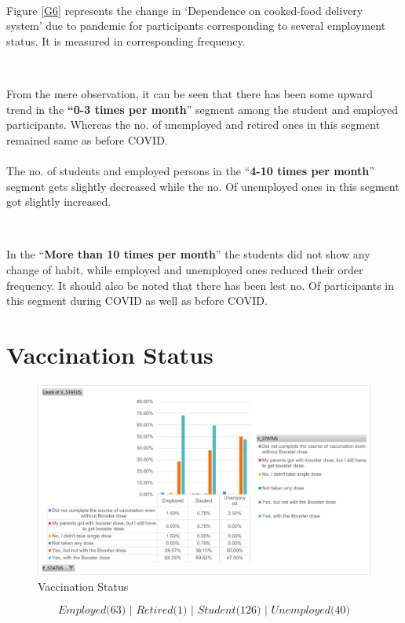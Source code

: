 \ 

Figure \ref{G6} represents the change in ‘Dependence on cooked-food delivery system’ due to pandemic for participants corresponding to several employment status. It is measured in corresponding frequency. 

\ 

From the mere observation, it can be seen that there has been some upward trend in the \textbf{“0-3 times per month}” segment among the student and employed participants. Whereas the no. of unemployed and retired ones in this segment remained same as before COVID.\\ \\
The no. of students and employed persons in the “\textbf{4-10 times per month}” segment gets slightly decreased while the no. Of unemployed ones in this segment got slightly increased.

\

In the “\textbf{More than 10 times per month}” the students did not show any change of habit, while employed and unemployed ones reduced their order frequency. It should also be noted that there has been lest no. Of participants in this segment during COVID as well as before COVID. 

\newpage

\section{Vaccination Status}

\begin{figure}[h!]
	\centering
	\includegraphics[width=0.9\linewidth]{IMAGES/Image 7.jpg}
	\caption{Vaccination Status}
	\label{G7}
\end{figure}
$$\textit{Employed($63$) | Retired($1$) | Student($126$) | Unemployed($40$)}$$

\ 

